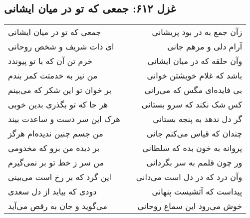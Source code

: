 \begin{center}
\section*{غزل ۶۱۲: جمعی که تو در میان ایشانی}
\label{sec:612}
\begin{longtable}{l p{0.5cm} r}
جمعی که تو در میان ایشانی
&&
زآن جمع به در بود پریشانی
\\
ای ذات شریف و شخص روحانی
&&
آرام دلی و مرهم جانی
\\
خرم تن آن که با تو پیوندد
&&
وآن حلقه که در میان ایشانی
\\
من نیز به خدمتت کمر بندم
&&
باشد که غلام خویشتن خوانی
\\
بر خوان تو این شکر که می‌بینم
&&
بی فایده‌ای مگس که می‌رانی
\\
هر جا که تو بگذری بدین خوبی
&&
کس شک نکند که سرو بستانی
\\
هرک این سر دست و ساعدت بیند
&&
گر دل ندهد به پنجه بستانی
\\
من جسم چنین ندیده‌ام هرگز
&&
چندان که قیاس می‌کنم جانی
\\
بر دیده من برو که مخدومی
&&
پروانه به خون بده که سلطانی
\\
من سر ز خط تو بر نمی‌گیرم
&&
ور چون قلمم به سر بگردانی
\\
این گرد که بر رخ است می‌بینی
&&
وآن درد که در دل است می‌دانی
\\
دودی که بیاید از دل سعدی
&&
پیداست که آتشیست پنهانی
\\
می‌گوید و جان به رقص می‌آید
&&
خوش می‌رود این سماع روحانی
\\
\end{longtable}
\end{center}
